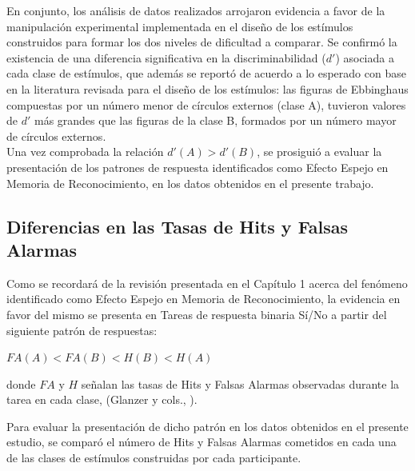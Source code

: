En conjunto, los análisis de datos realizados arrojaron evidencia a favor de la manipulación experimental implementada en el diseño de los estímulos construidos para formar los dos niveles de dificultad a comparar. Se confirmó la existencia de una diferencia significativa en la discriminabilidad ($d'$) asociada a cada clase de estímulos, que además se reportó de acuerdo a lo esperado con base en la literatura revisada para el diseño de los estímulos: las figuras de Ebbinghaus compuestas por un número menor de círculos externos (clase A), tuvieron valores de $d'$ más grandes que las figuras de la clase B, formados por un número mayor de círculos externos.\\

Una vez comprobada la relación $d'(A) > d'(B)$, se prosiguió a evaluar la presentación de los patrones de respuesta identificados como Efecto Espejo en Memoria de Reconocimiento, en los datos obtenidos en el presente trabajo.\\












\subsection{Diferencias en las Tasas de Hits y Falsas Alarmas}

Como se recordará de la revisión presentada en el Capítulo 1 acerca del fenómeno identificado como Efecto Espejo en Memoria de Reconocimiento, la evidencia en favor del mismo se presenta en Tareas de respuesta binaria Sí/No a partir del siguiente patrón de respuestas:\\
 
\begin{center}
$FA(A) < FA(B) < H(B) < H(A)$\\
\end{center}
\begin{center}
donde $FA$ y $H$ señalan las tasas de Hits y Falsas Alarmas observadas durante la tarea en cada clase, (Glanzer y cols., \citeyear{Glanzer1993}).\\
\end{center}

Para evaluar la presentación de dicho patrón en los datos obtenidos en el presente estudio, se comparó el número de Hits y Falsas Alarmas cometidos en cada una de las clases de estímulos construidas por cada participante.\\

